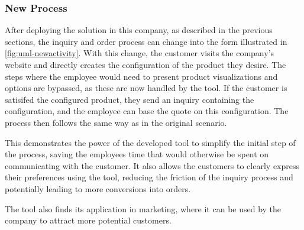 \subsubsection{New Process}

After deploying the solution in this company, as described in the previous sections, the inquiry and order process can change into the form illustrated in \autoref{fig:uml-newactivity}. With this change, the customer visits the company's website and directly creates the configuration of the product they desire. The steps where the employee would need to present product visualizations and options are bypassed, as these are now handled by the tool. If the customer is satisifed the configured product, they send an inquiry containing the configuration, and the employee can base the quote on this configuration. The process then follows the same way as in the original scenario.

This demonstrates the power of the developed tool to simplify the initial step of the process, saving the employees time that would otherwise be spent on communicating with the customer. It also allows the customers to clearly express their preferences using the tool, reducing the friction of the inquiry process and potentially leading to more conversions into orders.

The tool also finds its application in marketing, where it can be used by the company to attract more potential customers.
